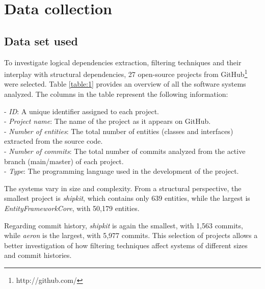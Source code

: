 \section{Data collection}
\label{sec:data_collection}


\subsection{Data set used}
\label{subsec:data_sets_used}

\hspace{4em}To investigate logical dependencies extraction, filtering techniques and their interplay with structural dependencies, 27 open-source projects from GitHub\footnote{http://github.com/} were selected. Table \ref{table:1} provides an overview of all the software systems analyzed. The columns in the table represent the following information:

\hspace{-4em}- \textit{ID}: A unique identifier assigned to each project. \\
- \textit{Project name}: The name of the project as it appears on GitHub. \\
- \textit{Number of entities}: The total number of entities (classes and interfaces) extracted from the source code. \\
- \textit{Number of commits}: The total number of commits analyzed from the active branch (main/master) of each project. \\
- \textit{Type}: The programming language used in the development of the project.


The systems vary in size and complexity. From a structural perspective, the smallest project is \textit{shipkit}, which contains only 639 entities, while the largest is \textit{EntityFrameworkCore}, with 50,179 entities.

Regarding commit history, \textit{shipkit} is again the smallest, with 1,563 commits, while \textit{aeron} is the largest, with 5,977 commits. This selection of projects allows a better investigation of how filtering techniques affect systems of different sizes and commit histories.


